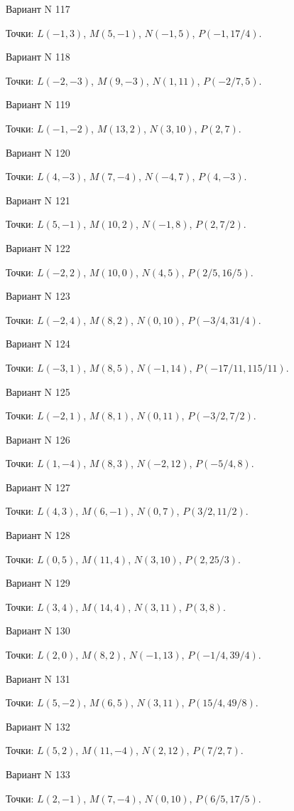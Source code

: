 \documentclass[11pt]{report}
\begin{document}
Вариант N 117

Точки: $L(-1, 3)$, $M(5, -1)$, $N(-1, 5)$, $P(-1, 17/4)$.

Вариант N 118

Точки: $L(-2, -3)$, $M(9, -3)$, $N(1, 11)$, $P(-2/7, 5)$.

Вариант N 119

Точки: $L(-1, -2)$, $M(13, 2)$, $N(3, 10)$, $P(2, 7)$.

Вариант N 120

Точки: $L(4, -3)$, $M(7, -4)$, $N(-4, 7)$, $P(4, -3)$.

Вариант N 121

Точки: $L(5, -1)$, $M(10, 2)$, $N(-1, 8)$, $P(2, 7/2)$.

Вариант N 122

Точки: $L(-2, 2)$, $M(10, 0)$, $N(4, 5)$, $P(2/5, 16/5)$.

Вариант N 123

Точки: $L(-2, 4)$, $M(8, 2)$, $N(0, 10)$, $P(-3/4, 31/4)$.

Вариант N 124

Точки: $L(-3, 1)$, $M(8, 5)$, $N(-1, 14)$, $P(-17/11, 115/11)$.

Вариант N 125

Точки: $L(-2, 1)$, $M(8, 1)$, $N(0, 11)$, $P(-3/2, 7/2)$.

Вариант N 126

Точки: $L(1, -4)$, $M(8, 3)$, $N(-2, 12)$, $P(-5/4, 8)$.

Вариант N 127

Точки: $L(4, 3)$, $M(6, -1)$, $N(0, 7)$, $P(3/2, 11/2)$.

Вариант N 128

Точки: $L(0, 5)$, $M(11, 4)$, $N(3, 10)$, $P(2, 25/3)$.

Вариант N 129

Точки: $L(3, 4)$, $M(14, 4)$, $N(3, 11)$, $P(3, 8)$.

Вариант N 130

Точки: $L(2, 0)$, $M(8, 2)$, $N(-1, 13)$, $P(-1/4, 39/4)$.

Вариант N 131

Точки: $L(5, -2)$, $M(6, 5)$, $N(3, 11)$, $P(15/4, 49/8)$.

Вариант N 132

Точки: $L(5, 2)$, $M(11, -4)$, $N(2, 12)$, $P(7/2, 7)$.

Вариант N 133

Точки: $L(2, -1)$, $M(7, -4)$, $N(0, 10)$, $P(6/5, 17/5)$.
\end{document}
